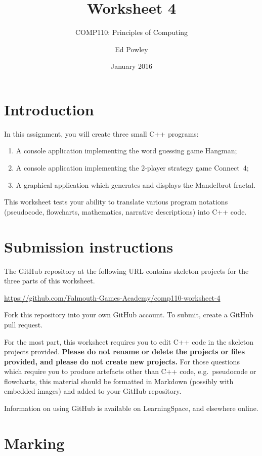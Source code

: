 \documentclass{scrartcl}
\title{Worksheet 4}
\subtitle{COMP110: Principles of Computing}
\author{Ed Powley}
\date{January 2016}
\begin{document}
\maketitle

\section*{Introduction}

In this assignment, you will create three small C++ programs:
\begin{enumerate}[label=\Alph*.]
	\item A console application implementing the word guessing game Hangman;
	\item A console application implementing the 2-player strategy game Connect~4;
	\item A graphical application which generates and displays the Mandelbrot fractal.
\end{enumerate}

This worksheet tests your ability to translate various program notations (pseudocode, flowcharts,
mathematics, narrative descriptions) into C++ code.

\section*{Submission instructions}

The GitHub repository at the following URL contains skeleton projects for the three parts of this worksheet.
\begin{center}
\url{https://github.com/Falmouth-Games-Academy/comp110-worksheet-4}
\end{center}
Fork this repository into your own GitHub account. To submit, create a GitHub pull request.

For the most part, this worksheet requires you to edit C++ code in the skeleton projects provided.
\textbf{Please do not rename or delete the projects or files provided, and please do not create new projects.}
For those questions which require you to produce artefacts other than C++ code, e.g.\ pseudocode or flowcharts,
this material should be formatted in Markdown (possibly with embedded images) and added to your GitHub repository.

Information on using GitHub is available on LearningSpace, and elsewhere online.

\section*{Marking}
\end{document}
